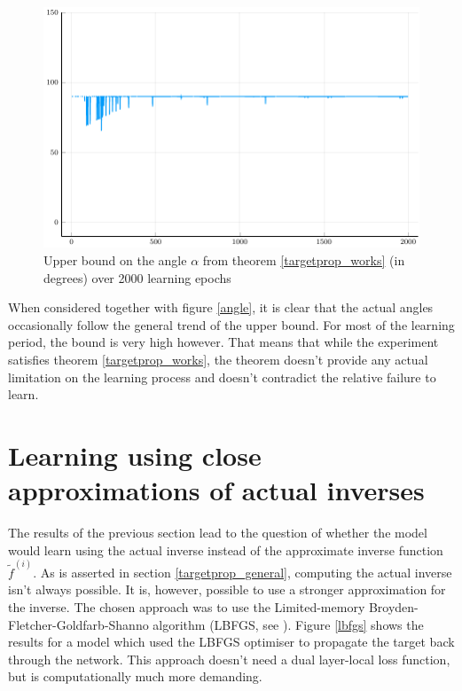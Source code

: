 \begin{figure}
	\centering
	\includegraphics[width=\textwidth]{images/relu-angle-bound/angle-bound.pdf}
	\caption{Upper bound on the angle \( \alpha \) from theorem \ref{targetprop_works} (in degrees) over 2000 learning epochs}\label{angle-bound}
\end{figure}

When considered together with figure \ref{angle}, it is clear that the actual angles occasionally follow the general trend of the upper bound. For most of the learning period, the bound is very high however. That means that while the experiment satisfies theorem \ref{targetprop_works}, the theorem doesn't provide any actual limitation on the learning process and doesn't contradict the relative failure to learn.

\section{Learning using close approximations of actual inverses}
The results of the previous section lead to the question of whether the model would learn using the actual inverse instead of the approximate inverse function \( \widetilde{f}^{(i)} \). As is asserted in section \ref{targetprop_general}, computing the actual inverse isn't always possible. It is, however, possible to use a stronger approximation for the inverse. The chosen approach was to use the Limited-memory Broyden-Fletcher-Goldfarb-Shanno algorithm (LBFGS, see \cite{liu_limited_1989}). Figure \ref{lbfgs} shows the results for a model which used the LBFGS optimiser to propagate the target back through the network. This approach doesn't need a dual layer-local loss function, but is computationally much more demanding.


